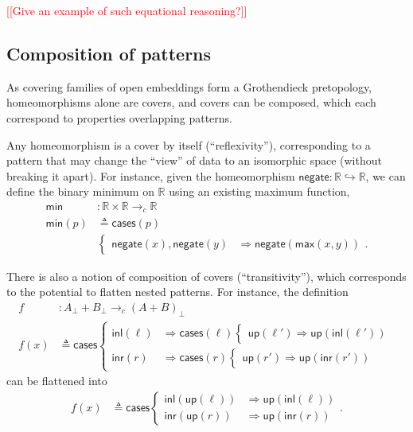 \documentclass[conference]{IEEEtran}
\newcommand{\hookto}{\hookrightarrow}
\newcommand{\cto}{\to_c}
\newcommand{\R}{\mathbb{R}}
\newcommand{\negate}{\mathsf{negate}}
\newcommand{\Branch}{\Rightarrow}
\newcommand{\note}[1]{\textcolor{red}{[[{#1}]]}}
\newcommand{\up}{\mathsf{up}}
\begin{document}
\note{Give an example of such equational reasoning?}


\subsection{Composition of patterns}

As covering families of open embeddings form a Grothendieck pretopology, homeomorphisms alone are covers, and covers can be composed, which each correspond to properties overlapping patterns.

Any homeomorphism is a cover by itself (``reflexivity''), corresponding to a pattern that may change the ``view'' of data to an isomorphic space (without breaking it apart). For instance, given the homeomorphism $\negate : \R \hookto \R$, we can define the binary minimum on $\R$ using an existing maximum function,
\begin{align*}
\mathsf{min} &: \R \times \R \cto \R
\\ \mathsf{min}(p) &\triangleq \mathsf{cases}(p)
\\ &\begin{cases}
\negate(x), \negate(y) &\Branch \negate(\mathsf{max}(x, y))
\end{cases}.
\end{align*}

There is also a notion of composition of covers (``transitivity''), which corresponds to the potential to flatten nested patterns. For instance, the definition
\begin{align*}
f &: A_\bot + B_\bot \cto \left(A + B\right)_\bot
\\ f(x) &\triangleq \mathsf{cases}
\begin{cases}
\mathsf{inl}(\ell) &\Branch \mathsf{cases}(\ell)
  \begin{cases}
  \up(\ell') \Branch \up(\mathsf{inl}(\ell'))
  \end{cases}
\\
\mathsf{inr}(r) &\Branch \mathsf{cases}(r)
  \begin{cases}
  \up(r') \Branch \up(\mathsf{inr}(r'))
  \end{cases}
\end{cases}
\end{align*}
can be flattened into
\begin{align*}
f(x) &\triangleq \mathsf{cases}
\begin{cases}
\mathsf{inl}(\up(\ell)) &\Branch \up(\mathsf{inl}(\ell))
\\
\mathsf{inr}(\up(r)) &\Branch \up(\mathsf{inr}(r))
\end{cases}.
\end{align*}
\end{document}
